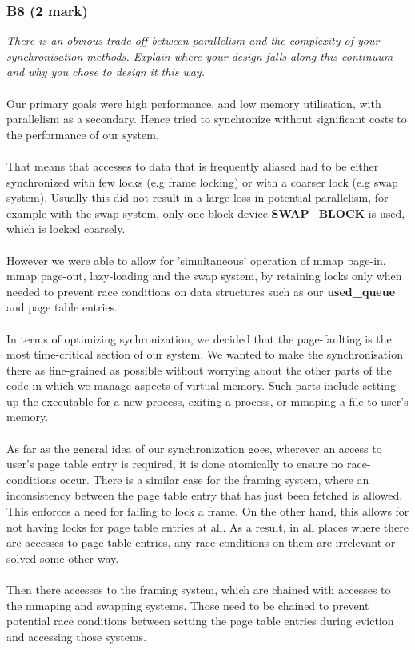 \documentclass{report}
\newcommand{\question}[1]{\textit{#1} \ }
\newcommand{\var}[1]{\textcolor{RoyalPurple}{\textbf{#1}}}
\newcommand{\const}[1]{\textcolor{BrickRed}{\textbf{#1}}}
\begin{document}
			\subsubsection*{B8 (2 mark)}
				\question{There is an obvious trade-off between parallelism and the 
				complexity of your synchronisation methods. Explain where your design 
				falls along this continuum and why you chose to design it this way.}
				\\
				\\Our primary goals were high performance, and low memory utilisation, with parallelism 
				as a secondary. Hence tried to synchronize without significant costs
				to the performance of our system. 
				\\
				\\That means that accesses to data that is frequently aliased had to be either 
				synchronized with few locks (e.g frame locking) or with a coarser lock (e.g swap system).
				Usually this did not result in a large loss in potential parallelism, for example with 
				the swap system, only one block device \const{SWAP\_BLOCK} is used, which is locked coarsely.
				\\
				\\ However we were able to allow for 'simultaneous' operation of mmap page-in, mmap page-out, 
				lazy-loading and the swap system, by retaining locks only when needed to prevent race conditions 
				on data structures such as our \var{used\_queue} and page table entries.
				\\
				\\In terms of optimizing sychronization, we decided that the page-faulting is the
				most time-critical section of our system. We wanted to make the synchronisation
				there as fine-grained as possible without worrying about the other parts of the
				code in which we manage aspects of virtual memory. Such parts include setting up
				the executable for a new process, exiting a process, or mmaping a file to user's memory.
				\\
				\\ As far as the general idea of our synchronization goes, wherever an access to user's page table entry is required,
				it is done atomically to ensure no race-conditions occur. There is a similar case for the framing system,
				where an inconsistency between the page table entry that has just been fetched is allowed. This enforces a need for
				failing to lock a frame. On the other hand, this allows for not having locks for page table entries at all. As a result, in all places
				where there are accesses to page table entries, any race conditions on them are irrelevant or solved some other way.
				\\
				\\Then there accesses to the framing system, which are chained with accesses to the mmaping and swapping systems.
				Those need to be chained to prevent potential race conditions between setting the page table entries during eviction and accessing those systems.
				
\end{document}
